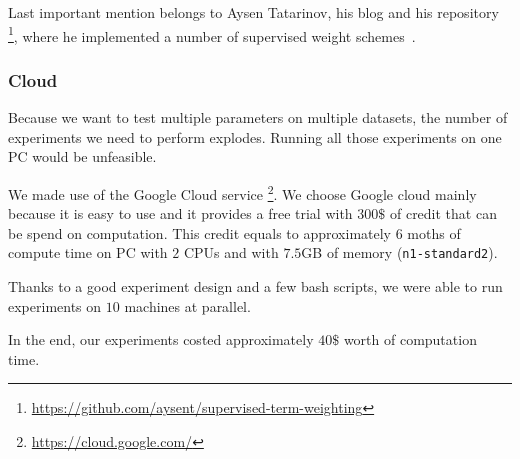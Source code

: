     Last important mention belongs to Aysen Tatarinov, his blog and his repository \footnote{\url{https://github.com/aysent/supervised-term-weighting}}, where he implemented a number of supervised weight schemes~\cite{maas2011learning}.
    
    
    \subsubsection{Cloud} 
    Because we want to test multiple parameters on multiple datasets, the number of experiments we need to perform explodes.
    Running all those experiments on one PC would be unfeasible.
    
    We made use of the Google Cloud service \footnote{\url{https://cloud.google.com/}}.
    We choose Google cloud mainly because it is easy to use and it provides a free trial with $300\$$ of credit that can be spend on computation. 
    This credit equals to approximately $6$ moths of compute time on PC with $2$ CPUs and with $7.5$GB of memory (\texttt{n1-standard2}).
    
    Thanks to a good experiment design and a few bash scripts,
    we were able to run experiments on $10$ machines at parallel.
    
    
    In the end, our experiments costed approximately $40\$$ worth of computation time.
    